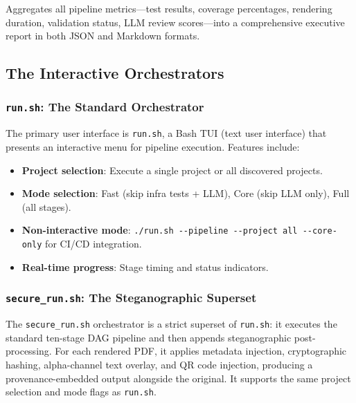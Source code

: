 \documentclass[
]{article}
\providecommand{\tightlist}{%
  \setlength{\itemsep}{0pt}\setlength{\parskip}{0pt}}
\begin{document}
Aggregates all pipeline metrics---test results, coverage percentages,
rendering duration, validation status, LLM review scores---into a
comprehensive executive report in both JSON and Markdown formats.

\subsection{The Interactive
Orchestrators}\label{the-interactive-orchestrators}

\subsubsection{\texorpdfstring{\texttt{run.sh}: The Standard
Orchestrator}{run.sh: The Standard Orchestrator}}\label{run.sh-the-standard-orchestrator}

The primary user interface is \texttt{run.sh}, a Bash TUI (text user
interface) that presents an interactive menu for pipeline execution.
Features include:

\begin{itemize}
\tightlist
\item
  \textbf{Project selection}: Execute a single project or all discovered
  projects.
\item
  \textbf{Mode selection}: Fast (skip infra tests + LLM), Core (skip LLM
  only), Full (all stages).
\item
  \textbf{Non-interactive mode}:
  \texttt{./run.sh\ -\/-pipeline\ -\/-project\ all\ -\/-core-only} for
  CI/CD integration.
\item
  \textbf{Real-time progress}: Stage timing and status indicators.
\end{itemize}

\subsubsection{\texorpdfstring{\texttt{secure\_run.sh}: The
Steganographic
Superset}{secure\_run.sh: The Steganographic Superset}}\label{secure_run.sh-the-steganographic-superset}

The \texttt{secure\_run.sh} orchestrator is a strict superset of
\texttt{run.sh}: it executes the standard ten-stage DAG pipeline and
then appends steganographic post-processing. For each rendered PDF, it
applies metadata injection, cryptographic hashing, alpha-channel text
overlay, and QR code injection, producing a provenance-embedded output
alongside the original. It supports the same project selection and mode
flags as \texttt{run.sh}.
\end{document}

